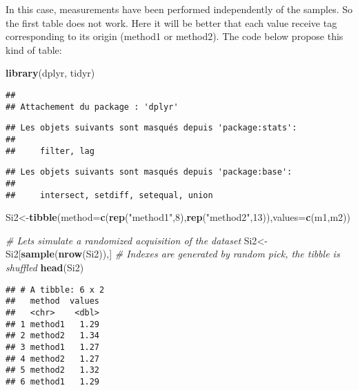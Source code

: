 \documentclass[
]{article}
\newenvironment{Shaded}{\begin{snugshade}}{\end{snugshade}}
\newcommand{\AttributeTok}[1]{\textcolor[rgb]{0.13,0.29,0.53}{#1}}
\newcommand{\CommentTok}[1]{\textcolor[rgb]{0.56,0.35,0.01}{\textit{#1}}}
\newcommand{\DecValTok}[1]{\textcolor[rgb]{0.00,0.00,0.81}{#1}}
\newcommand{\FunctionTok}[1]{\textcolor[rgb]{0.13,0.29,0.53}{\textbf{#1}}}
\newcommand{\NormalTok}[1]{#1}
\newcommand{\OtherTok}[1]{\textcolor[rgb]{0.56,0.35,0.01}{#1}}
\newcommand{\StringTok}[1]{\textcolor[rgb]{0.31,0.60,0.02}{#1}}
\begin{document}
In this case, measurements have been performed independently of the
samples. So the first table does not work. Here it will be better that
each value receive tag corresponding to its origin (method1 or method2).
The code below propose this kind of table:

\begin{Shaded}
\begin{Highlighting}[]
\FunctionTok{library}\NormalTok{(dplyr, tidyr)}
\end{Highlighting}
\end{Shaded}

\begin{verbatim}
## 
## Attachement du package : 'dplyr'
\end{verbatim}

\begin{verbatim}
## Les objets suivants sont masqués depuis 'package:stats':
## 
##     filter, lag
\end{verbatim}

\begin{verbatim}
## Les objets suivants sont masqués depuis 'package:base':
## 
##     intersect, setdiff, setequal, union
\end{verbatim}

\begin{Shaded}
\begin{Highlighting}[]
\NormalTok{Si2}\OtherTok{\textless{}{-}}\FunctionTok{tibble}\NormalTok{(}\AttributeTok{method=}\FunctionTok{c}\NormalTok{(}\FunctionTok{rep}\NormalTok{(}\StringTok{"method1"}\NormalTok{,}\DecValTok{8}\NormalTok{),}\FunctionTok{rep}\NormalTok{(}\StringTok{"method2"}\NormalTok{,}\DecValTok{13}\NormalTok{)),}\AttributeTok{values=}\FunctionTok{c}\NormalTok{(m1,m2))}

\CommentTok{\# Let\textquotesingle{}s simulate a randomized acquisition of the dataset}
\NormalTok{Si2}\OtherTok{\textless{}{-}}\NormalTok{Si2[}\FunctionTok{sample}\NormalTok{(}\FunctionTok{nrow}\NormalTok{(Si2)),] }\CommentTok{\# Indexes are generated by random pick, the tibble is shuffled}
\FunctionTok{head}\NormalTok{(Si2)}
\end{Highlighting}
\end{Shaded}

\begin{verbatim}
## # A tibble: 6 x 2
##   method  values
##   <chr>    <dbl>
## 1 method1   1.29
## 2 method2   1.34
## 3 method1   1.27
## 4 method2   1.27
## 5 method2   1.32
## 6 method1   1.29
\end{verbatim}
\end{document}

